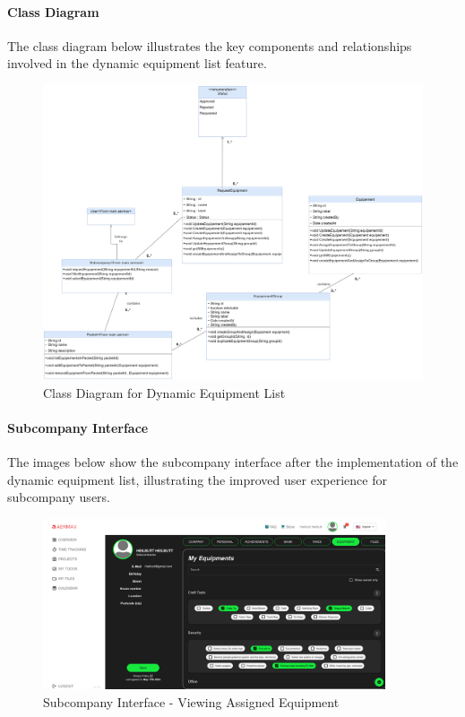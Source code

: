 \paragraph{Class Diagram}
The class diagram below illustrates the key components and relationships involved in the dynamic equipment list feature.

\begin{figure}[H]
\centering
\includegraphics[width=1\textwidth]{src/assets/diagrams/DynamiEquipementListPng.png}
\caption{Class Diagram for Dynamic Equipment List}
\label{fig:class_diagram}
\end{figure}

\paragraph{Subcompany Interface}
The images below show the subcompany interface after the implementation of the dynamic equipment list, illustrating the improved user experience for subcompany users.

\begin{figure}[H]
\centering
\includegraphics[width=0.9\textwidth]{src/assets/images/Interface1.png}
\caption{Subcompany Interface - Viewing Assigned Equipment}
\label{fig:subcompany_interface_1}
\end{figure}

